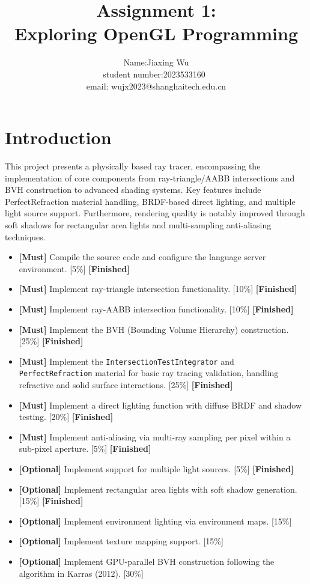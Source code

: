 \documentclass[acmtog]{acmart}
\title{Assignment 1:\\ {Exploring OpenGL Programming}}
\author{Name:Jiaxing Wu \quad \\ student number:2023533160\
\\email: wujx2023@shanghaitech.edu.cn\quad \texttt{}}
\begin{document}
\maketitle

\vspace*{2 ex}

\section{Introduction}
This project presents a physically based ray tracer, encompassing the implementation of core components from ray-triangle/AABB intersections and BVH construction to advanced shading systems. Key features include PerfectRefraction material handling, BRDF-based direct lighting, and multiple light source support. Furthermore, rendering quality is notably improved through soft shadows for rectangular area lights and multi-sampling anti-aliasing techniques.

\begin{itemize}
    \item \textbf{[Must]} Compile the source code and configure the language server environment. [5\%] \hfill \textbf{[Finished]}
    \item \textbf{[Must]} Implement ray-triangle intersection functionality. [10\%] \hfill \textbf{[Finished]}
    \item \textbf{[Must]} Implement ray-AABB intersection functionality. [10\%] \hfill \textbf{[Finished]}
    \item \textbf{[Must]} Implement the BVH (Bounding Volume Hierarchy) construction. [25\%] \hfill \textbf{[Finished]}
    \item \textbf{[Must]} Implement the \texttt{IntersectionTestIntegrator} and \texttt{PerfectRefraction} material for basic ray tracing validation, handling refractive and solid surface interactions. [25\%] \hfill \textbf{[Finished]}
    \item \textbf{[Must]} Implement a direct lighting function with diffuse BRDF and shadow testing. [20\%] \hfill \textbf{[Finished]}
    \item \textbf{[Must]} Implement anti-aliasing via multi-ray sampling per pixel within a sub-pixel aperture. [5\%] \hfill \textbf{[Finished]}
    \item \textbf{[Optional]} Implement support for multiple light sources. [5\%] \hfill \textbf{[Finished]}
    \item \textbf{[Optional]} Implement rectangular area lights with soft shadow generation. [15\%] \hfill \textbf{[Finished]}
    \item \textbf{[Optional]} Implement environment lighting via environment maps. [15\%]
    \item \textbf{[Optional]} Implement texture mapping support. [15\%]
    \item \textbf{[Optional]} Implement GPU-parallel BVH construction following the algorithm in Karras (2012). [30\%]
\end{itemize}
\end{document}
